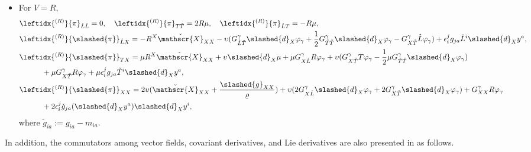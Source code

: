 \documentclass[11pt,twoside]{article}
\def\vp{\varphi}
\begin{document}
\begin{lemma}
\begin{itemize}
\item For $V = R$,
\begin{equation}\label{Rpi}
\begin{split}
&\leftidx{^{(R)}}{\pi}_{\mathring{L}\mathring{L}} = 0,
\quad \leftidx{^{(R)}}{\pi}_{T\tilde{T}} = 2R\mu,
\quad \leftidx{^{(R)}}{\pi}_{\mathring{L}T} = -R\mu, \\
&\leftidx{^{(R)}}{\slashed{\pi}}_{\mathring{L}X} = -{R}^X\check{\mathscr{X}}_{XX}
-\upsilon(G_{\mathring{L}\tilde{T}}^\gamma\slashed{d}_X\vp_\gamma
+ \frac{1}{2}G_{\tilde{T}\tilde{T}}^\gamma\slashed{d}_X\vp_\gamma
- G_{X\tilde{T}}^\gamma{\mathring{L}}\vp_\gamma)
+ \epsilon_i^jg_{ja}\check{L}^i\slashed{d}_Xy^a, \\
&\leftidx{^{(R)}}{\slashed{\pi}}_{TX} = \mu{R}^X\check{\mathscr{X}}_{XX}
+ \upsilon\slashed{d}_X\mu
+ \mu G_{X\mathring{L}}^\gamma R\vp_{\gamma}
+ \upsilon(G_{X\tilde{T}}^\gamma T\vp_\gamma
- \frac{1}{2}\mu G_{\tilde{T}\tilde{T}}^\gamma\slashed{d}_X\vp_{\gamma})\\
&\qquad\quad + \mu G_{X\tilde{T}}^\gamma R\vp_{\gamma}
+ \mu\epsilon_i^j g_{ja}\check{T}^i\slashed{d}_Xy^a, \\
&\leftidx{^{(R)}}{\slashed{\pi}}_{XX} = 2\upsilon(\check{\mathscr{X}}_{XX}
+ \frac{\slashed{g}_{XX}}{\varrho})
+ \upsilon(2G_{X\mathring{L}}^\gamma\slashed{d}_X\vp_{\gamma}
+ 2G_{X\tilde{T}}^\gamma\slashed{d}_X\vp_{\gamma})
+ G_{XX}^\gamma R\vp_{\gamma} \\
&\qquad\quad + 2\epsilon_i^j\check{g}_{ja}(\slashed{d}_Xy^a)\slashed{d}_Xy^i,
\end{split}
\end{equation}
where $\check{g}_{ia} := g_{ia}-m_{ia}$.
\end{itemize}
\end{lemma}
In addition, the commutators among vector fields, covariant derivatives, and Lie derivatives are also presented in \cite[Appendix A]{Ding4}
as follows.
\end{document}

